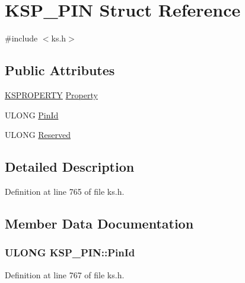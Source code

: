 \hypertarget{struct_k_s_p___p_i_n}{}\section{K\+S\+P\+\_\+\+P\+IN Struct Reference}
\label{struct_k_s_p___p_i_n}


{\ttfamily \#include $<$ks.\+h$>$}

\subsection*{Public Attributes}
\begin{DoxyCompactItemize}
\item 
\hyperlink{ks_8h_a4392f77c74e868d813d46c39ada4d660}{K\+S\+P\+R\+O\+P\+E\+R\+TY} \hyperlink{struct_k_s_p___p_i_n_a69ef465f32c95fd3a8423710adcbe9bd}{Property}
\item 
U\+L\+O\+NG \hyperlink{struct_k_s_p___p_i_n_a7d30633c0a1e9de7dbadb526e89081d0}{Pin\+Id}
\item 
U\+L\+O\+NG \hyperlink{struct_k_s_p___p_i_n_a6823174c71751e5a1cb4a0020ddeed1d}{Reserved}
\end{DoxyCompactItemize}


\subsection{Detailed Description}


Definition at line 765 of file ks.\+h.



\subsection{Member Data Documentation}
\subsubsection[{\texorpdfstring{Pin\+Id}{PinId}}]{\setlength{\rightskip}{0pt plus 5cm}U\+L\+O\+NG K\+S\+P\+\_\+\+P\+I\+N\+::\+Pin\+Id}\hypertarget{struct_k_s_p___p_i_n_a7d30633c0a1e9de7dbadb526e89081d0}{}\label{struct_k_s_p___p_i_n_a7d30633c0a1e9de7dbadb526e89081d0}


Definition at line 767 of file ks.\+h.

